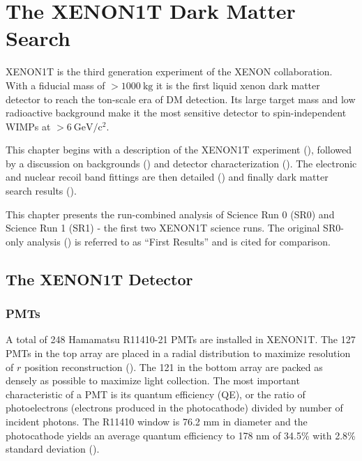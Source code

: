 

\pagestyle{cu}
\graphicspath{{./Chapter3/Figures/}}
\chapter[The XENON1T Dark Matter Search][The XENON1T Dark Matter Search]{The XENON1T Dark Matter Search}



XENON1T is the third generation experiment of the XENON collaboration.  With a fiducial mass of $> 1000\ \mathrm{kg}$ it is the first
liquid xenon dark matter detector to reach the ton-scale era of DM detection.  Its large target mass and low radioactive background
make it the most sensitive detector to spin-independent WIMPs at $> 6\ \mathrm{GeV / c^2}$.

This chapter begins with a description of the XENON1T experiment (), followed by a discussion on backgrounds
() and detector characterization ().  The electronic and nuclear recoil band fittings are
then detailed () and finally dark matter search results ().

This chapter presents the run-combined analysis of Science Run 0 (SR0) and Science Run 1 (SR1) - the first two XENON1T science
runs.  The original SR0-only analysis () is referred to as ``First Results'' and is cited for comparison.

\section{The XENON1T Detector}
\label{sec:xenon1t_detector}




\subsection{PMTs}
\label{subsec:xenon1t_pmts}
A total of 248 Hamamatsu R11410-21 PMTs are installed in XENON1T.  The 127 PMTs in the top array are placed in a radial distribution to
maximize resolution of $r$ position reconstruction ().  The 121 in the bottom array
are packed as densely as possible to maximize light collection.  The most important characteristic of a PMT is its quantum efficiency
(QE), or the ratio of photoelectrons (electrons produced in the photocathode) divided by number of incident photons.  The R11410 window is
76.2 mm in diameter and the photocathode yields an average quantum efficiency to 178 nm of 34.5\% with 2.8\%
standard deviation ().

